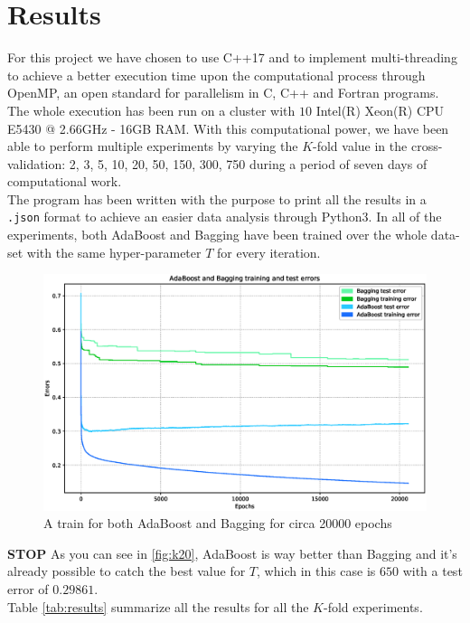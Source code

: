 
\chapter{Results}
For this project we have chosen to use C++17 and to implement multi-threading to achieve a better execution time upon the computational process through OpenMP, an open standard for parallelism in C, C++ and Fortran programs. The whole execution has been run on a cluster with $10$ Intel(R) Xeon(R) CPU E5430 @ 2.66GHz - 16GB RAM. With this computational power, we have been able to perform multiple experiments by varying the $K$-fold value in the cross-validation: 2, 3, 5, 10, 20, 50, 150, 300, 750 during a period of seven days of computational work.\\
The program has been written with the purpose to print all the results in a \texttt{.json} format to achieve an easier data analysis through Python3. In all of the experiments, both AdaBoost and Bagging have been trained over the whole data-set with the same hyper-parameter $T$ for every iteration.\\
\begin{figure}[htpb]
	\centering
	\includegraphics[scale=0.35]{figs/report_k20.eps}
	\caption{A train for both AdaBoost and Bagging for circa 20000 epochs}
	\label{fig:k20}
\end{figure}
\textbf{STOP}
As you can see in \autoref{fig:k20}, AdaBoost is way better than Bagging and it's already possible to catch the best value for $T$, which in this case is $650$ with a test error of $0.29861$.\\
Table \autoref{tab:results} summarize all the results for all the $K$-fold experiments.

